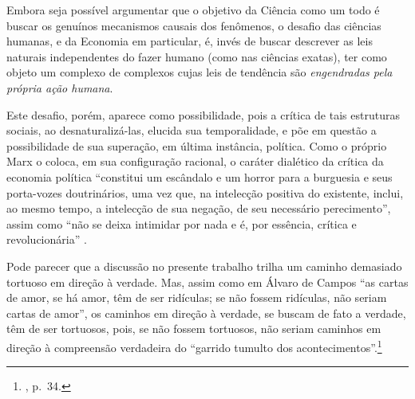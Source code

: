 Embora seja possível argumentar que o objetivo da Ciência como um todo é buscar os genuínos mecanismos causais dos fenômenos, o desafio das ciências humanas, e da Economia em particular, é, invés de buscar descrever as leis naturais independentes do fazer humano (como nas ciências exatas), ter como objeto um complexo de complexos cujas leis de tendência são \emph{engendradas pela própria ação humana}.

Este desafio, porém, aparece como possibilidade, pois a crítica de tais estruturas sociais, ao desnaturalizá-las, elucida sua temporalidade, e põe em questão a possibilidade de sua superação, em última instância, política. Como o próprio Marx o coloca, em sua configuração racional, o caráter dialético da crítica da economia política ``constitui um escândalo e um horror para a burguesia e seus porta-vozes doutrinários, uma vez que, na intelecção positiva do existente, inclui, ao mesmo tempo, a intelecção de sua negação, de seu necessário perecimento'', assim como ``não se deixa intimidar por nada e é, por essência, crítica e revolucionária'' \parencite[p. 91]{Marx2017}.

Pode parecer que a discussão no presente trabalho trilha um caminho demasiado tortuoso em direção à verdade. Mas, assim como em Álvaro de Campos ``as cartas de amor, se há amor, têm de ser ridículas; se não fossem ridículas, não seriam cartas de amor'', os caminhos em direção à verdade, se buscam de fato a verdade, têm de ser tortuosos, pois, se não fossem tortuosos, não seriam caminhos em direção à compreensão verdadeira do ``garrido tumulto dos acontecimentos''.\footnote{\textcite{Hegel1995}, p.~34.}

